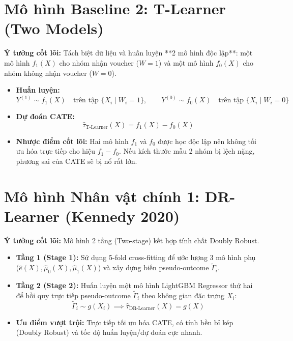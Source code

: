 \section{Mô hình Baseline 2: T-Learner (Two Models)}

\textbf{Ý tưởng cốt lõi:} Tách biệt dữ liệu và huấn luyện **2 mô hình độc lập**: một mô hình $f_1(X)$ cho nhóm nhận voucher ($W=1$) và một mô hình $f_0(X)$ cho nhóm không nhận voucher ($W=0$).

\begin{itemize}[leftmargin=*]
    \item \textbf{Huấn luyện:} 
    \begin{equation}
        Y^{(1)} \sim f_1(X) \quad \text{trên tập } \{X_i \mid W_i=1\}, \qquad Y^{(0)} \sim f_0(X) \quad \text{trên tập } \{X_i \mid W_i=0\}
    \end{equation}
    \item \textbf{Dự đoán CATE:}
    \begin{equation}
        \hat{\tau}_{\text{T-Learner}}(X) = f_1(X) - f_0(X)
    \end{equation}
    \item \textbf{Nhược điểm cốt lõi:} Hai mô hình $f_1$ và $f_0$ được học độc lập nên không tối ưu hóa trực tiếp cho hiệu $f_1 - f_0$. Nếu kích thước mẫu 2 nhóm bị lệch nặng, phương sai của CATE sẽ bị nổ rất lớn.
\end{itemize}

\section{Mô hình Nhân vật chính 1: DR-Learner (Kennedy 2020)}

\textbf{Ý tưởng cốt lõi:} Mô hình 2 tầng (Two-stage) kết hợp tính chất Doubly Robust.

\begin{itemize}[leftmargin=*]
    \item \textbf{Tầng 1 (Stage 1):} Sử dụng 5-fold cross-fitting để ước lượng 3 mô hình phụ ($\hat{e}(X), \hat{\mu}_0(X), \hat{\mu}_1(X)$) và xây dựng biến pseudo-outcome $\tilde{\Gamma}_i$.
    \item \textbf{Tầng 2 (Stage 2):} Huấn luyện một mô hình LightGBM Regressor thứ hai để hồi quy trực tiếp pseudo-outcome $\tilde{\Gamma}_i$ theo không gian đặc trưng $X_i$:
    \begin{equation}
        \tilde{\Gamma}_i \sim g(X_i) \implies \hat{\tau}_{\text{DR-Learner}}(X) = g(X)
    \end{equation}
    \item \textbf{Ưu điểm vượt trội:} Trực tiếp tối ưu hóa CATE, có tính bền bỉ kép (Doubly Robust) và tốc độ huấn luyện/dự đoán cực nhanh.
\end{itemize}

